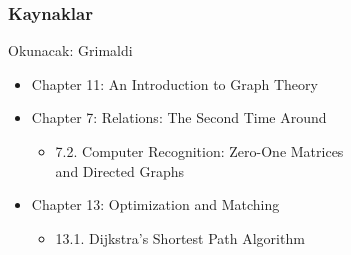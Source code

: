\documentclass[dvipsnames]{beamer}
\theoremstyle{definition}
\theoremstyle{example}
\theoremstyle{plain}
\begin{document}
\begin{frame}
  \frametitle{Kaynaklar}

  \begin{block}{Okunacak: Grimaldi}
    \begin{itemize}
      \item Chapter 11: \alert{An Introduction to Graph Theory}

      \item Chapter 7: Relations: The Second Time Around
      \begin{itemize}
        \item 7.2. \alert{Computer Recognition: Zero-One Matrices\\
                          and Directed Graphs}
      \end{itemize}

      \item Chapter 13: Optimization and Matching
      \begin{itemize}
        \item 13.1. \alert{Dijkstra's Shortest Path Algorithm}
      \end{itemize}
    \end{itemize}
  \end{block}
\end{frame}
\end{document}
